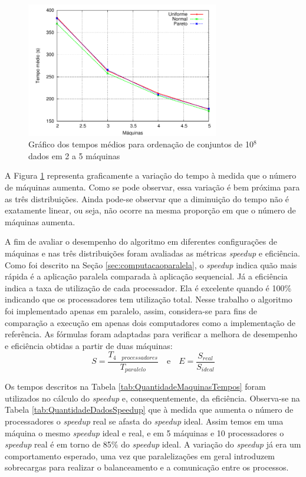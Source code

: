 \begin{figure}[!htb]
\centering
\includegraphics[width=0.75\textwidth]{figuras/MaquinasTempo.pdf}
\caption{Gráfico dos tempos médios para ordenação de conjuntos de 10$^8$ dados em 2 a 5 máquinas}
\label{fig:MaquinasTempos}
\end{figure}

A Figura \ref{fig:MaquinasTempos} representa graficamente a variação do tempo à medida que o número de máquinas aumenta. Como se pode observar, essa variação é bem próxima para as três distribuições. Ainda pode-se observar que a diminuição do tempo não é exatamente linear, ou seja, não ocorre na mesma proporção em que o número de máquinas aumenta. 



A fim de avaliar o desempenho do algoritmo em diferentes configurações de máquinas e nas três distribuições foram avaliadas as métricas \textit{speedup} e eficiência. 
Como foi descrito na Seção \ref{sec:computacaoparalela}, o \textit{speedup} indica quão mais rápida é a aplicação paralela comparada à aplicação sequencial. Já a eficiência  indica a taxa de utilização de cada processador. Ela é  excelente quando é 100\% indicando que os processadores tem utilização total.
Nesse trabalho o algoritmo foi implementado apenas em paralelo, assim, considera-se para fins de comparação a execução em apenas dois computadores como a implementação de referência. As fórmulas foram adaptadas para verificar a melhora de desempenho e eficiência obtidas a partir de duas máquinas: 
\[ S = \frac{T_{4 \quad processadores}}{T_{paralelo}}  
\quad\mbox{e}\quad
 E = \frac{S_{real}}{S_{ideal}}\]

Os tempos descritos na Tabela \ref{tab:QuantidadeMaquinasTempos} foram utilizados no cálculo do 
\textit{speedup} e, consequentemente, da eficiência.
Observa-se na Tabela \ref{tab:QuantidadeDadosSpeedup} que à medida que aumenta o número de processadores o \textit{speedup} real se afasta do \textit{speedup} ideal. Assim temos em uma máquina o mesmo \textit{speedup} ideal e real, e em 5 máquinas e 10 processadores o \textit{speedup} real é em torno de 85\% do \textit{speedup} ideal. A variação do \textit{speedup} já era um comportamento esperado, uma vez que paralelizações em geral introduzem sobrecargas para realizar o balanceamento e a comunicação entre os processos.

